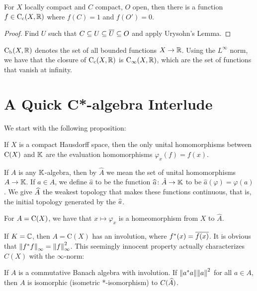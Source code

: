 \begin{proposition}
    For $X$ locally compact and $C$ compact, $O$ open, then there is a function $f \in \mathrm C_{\mathrm c}(X, \mathbb R)$ where $f(C) = 1$ and $f(O') = 0$.
\end{proposition}

\begin{proof}
    Find $U$ such that $C \subseteq U \subseteq \overline U \subseteq O$ and apply Urysohn's Lemma.
\end{proof}

\begin{definition}
    $\mathrm{C}_\mathrm{b}(X, \mathbb R)$ denotes the set of all bounded functions $X \to \mathbb R$. Using the $L^\infty$ norm, we have that the closure of $\mathrm C_{\mathrm c}(X, \mathbb R)$ is $\mathrm C_\infty(X, \mathbb R)$, which are the set of functions that vanish at infinity.
\end{definition}

\section{A Quick C*-algebra Interlude}

We start with the following proposition:

\begin{proposition}
    If $X$ is a compact Hausdorff space, then the only unital homomorphisms between $\mathrm C(X)$ and $\mathbb K$ are the evaluation homomorphisms $\varphi_x(f) = f(x)$.
\end{proposition}

If $A$ is any $\mathbb K$-algebra, then by $\widehat A$ we mean the set of unital homomorphisms $A \to \mathbb K$. If $a \in A$, we define $\widehat a$ to be the function $\widehat a \colon \hat A \to \mathbb K$ to be $\widehat a(\varphi) = \varphi(a)$. We give $\widehat A$ the weakest topology that makes these functions continuous, that is, the initial topology generated by the $\widehat a$.

\begin{proposition}
    For $A = \mathrm C(X)$, we have that $x \mapsto \varphi_x$ is a homeomorphism from $X$ to $\widehat A$.
\end{proposition}

If $K = \mathbb C$, then $A = \mathrm C(X)$ has an involution, where $f^*(x) = \overline{f(x)}$. It is obvious that $\norm{f^*f}_\infty = \norm{f}_\infty^2$. This seemingly innocent property actually characterizes $C(X)$ with the $\infty$-norm:

\begin{theorem}
    If $A$ is a commutative Banach algebra with involution. If $\norm{a^*a} \norm{a}^2$ for all $a \in A$, then $A$ is isomorphic (isometric *-isomorphism) to $C(\widehat A)$.
\end{theorem}

